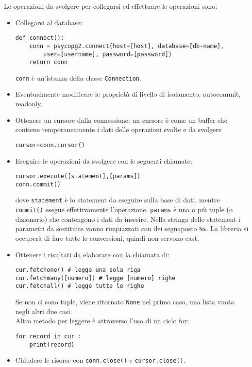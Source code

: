 \documentclass[a4paper, 10pt, titlepage]{article}
\begin{document}
	Le operazioni da svolgere per collegarsi ed effettuare le operazioni sono:
	\begin{itemize}
		\item Collegarsi al database:
		\begin{lstlisting}[frame=tb]
def connect():
	conn = psycopg2.connect(host=[host], database=[db-name],
		user=[username], password=[password])
	return conn
		\end{lstlisting}
		\lstinline|conn| è un'istanza della classe \lstinline|Connection|.
		
		\item Eventualmente modificare le proprietà di livello di isolamento, autocommit, readonly.
		\item Ottenere un cursore dalla connessione: un cursore è come un buffer che contiene temporaneamente i dati delle operazioni svolte e da svolgere
		\begin{lstlisting}[frame=tb]
cursor=conn.cursor()
		\end{lstlisting}
		
		\item Eseguire le operazioni da svolgere con le seguenti chiamate:
		\begin{lstlisting}[frame=tb]
cursor.execute([statement],[params])
conn.commit()
		\end{lstlisting}
		dove \lstinline|statement| è lo statement da eseguire sulla base di dati, mentre \lstinline|commit()| esegue effettivamente l'operazione. \lstinline|params| è una o più tuple (o dizionario) che contengono i dati da inserire. Nella stringa dello statement i parametri da sostituire vanno rimpiazzati con dei segnaposto \lstinline|%s|. La libreria si occuperà di fare tutte le conversioni, quindi non servono cast.
		
		\item Ottenere i risultati da elaborare con la chiamata di:
		\begin{lstlisting}[frame=tb]
cur.fetchone() # legge una sola riga
cur.fetchmany([numero]) # legge [numero] righe
cur.fetchall() # legge tutte le righe
		\end{lstlisting}
		Se non ci sono tuple, viene ritornato \lstinline|None| nel primo caso, una lista vuota negli altri due casi. \\
		Altro metodo per leggere è attraverso l'uso di un ciclo for:
		\begin{lstlisting}[frame=tb]
for record in cur :
	print(record)
		\end{lstlisting}
		
		\item Chiudere le risorse con \lstinline|conn.close()| e \lstinline|cursor.close()|.
	\end{itemize} \medskip
\end{document}
